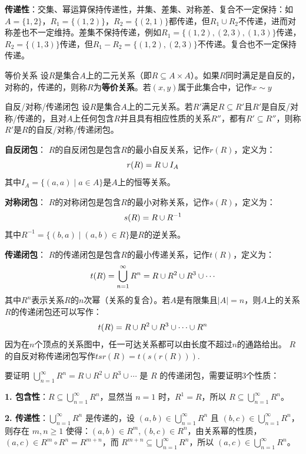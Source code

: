 \textbf{传递性}：交集、幂运算保持传递性，并集、差集、对称差、复合不一定保持：如$A = \{1,2\}$，$R_1 = \{(1,2)\}$，$R_2 = \{(2,1)\}$都传递，但$R_1 \cup R_2$不传递，进而对称差也不一定维持。差集不保持传递，例如$R_1=\{(1,2),(2,3),(1,3)\}$传递，$R_2=\{(1,3)\}$传递，但$R_1-R_2=\{(1,2),(2,3)\}$不传递。复合也不一定保持传递。
\begin{definition}{等价关系}{}
设$R$是集合$A$上的二元关系（即$R \subseteq A \times A$）。如果$R$同时满足是自反的，对称的，传递的，则称$R$为\textbf{等价关系}。若$(x,y)$属于此集合中，记作$x\sim y$
\end{definition}
\begin{definition}{自反/对称/传递闭包}{}
    设$R$是集合$A$上的二元关系。若$R'$满足$R \subseteq R'$且$R'$是自反/对称/传递的，且对$A$上任何包含$R$并且具有相应性质的关系$R''$，都有$R'\subseteq R''$，则称$R'$是$R$的自反/对称/传递闭包。

\textbf{自反闭包}：
$R$的自反闭包是包含$R$的最小自反关系，记作$r(R)$，定义为：\vspace{-10pt}
$$r(R) = R \cup I_A\vspace{-10pt}$$
其中$I_A = \{(a,a) \mid a \in A\}$是$A$上的恒等关系。

\textbf{对称闭包}：
$R$的对称闭包是包含$R$的最小对称关系，记作$s(R)$，定义为：\vspace{-10pt}
$$s(R) = R \cup R^{-1}\vspace{-10pt}$$
其中$R^{-1} = \{(b,a) \mid (a,b) \in R\}$是$R$的逆关系。

\textbf{传递闭包}：
$R$的传递闭包是包含$R$的最小传递关系，记作$t(R)$，定义为：\vspace{-10pt}
$$t(R) = \bigcup_{n=1}^{\infty} R^n = R \cup R^2 \cup R^3 \cup \cdots\vspace{-10pt}$$
其中$R^n$表示关系$R$的$n$次幂（关系的复合）。若$A$是有限集且$|A|=n$，则$A$上的关系$R$的传递闭包还可以写作：
\vspace{-10pt}
$$t(R) = R \cup R^2 \cup R^3 \cup \cdots\cup R^n\vspace{-10pt}$$
因为在$n$个顶点的关系图中，任一可达关系都可以由长度不超过$n$的通路给出。
$R$的自反对称传递闭包写作$tsr(R)=t(s(r(R)))$.
\end{definition}
要证明 $\bigcup_{n=1}^{\infty} R^n = R \cup R^2 \cup R^3 \cup \cdots$ 是 $R$ 的传递闭包，需要证明3个性质：

\textbf{1. 包含性}：$R \subseteq \bigcup_{n=1}^{\infty} R^n$，显然当 $n=1$ 时，$R^1 = R$，所以 $R \subseteq \bigcup_{n=1}^{\infty} R^n$。

\textbf{2. 传递性}：$\bigcup_{n=1}^{\infty} R^n$ 是传递的，设 $(a,b) \in \bigcup_{n=1}^{\infty} R^n$ 且 $(b,c) \in \bigcup_{n=1}^{\infty} R^n$，则存在 $m,n \geq 1$ 使得：$(a,b) \in R^m ,(b,c) \in R^n$，由关系幂的性质，$(a,c) \in R^m \circ R^n = R^{m+n}$，而 $R^{m+n} \subseteq \bigcup_{n=1}^{\infty} R^n$，所以 $(a,c) \in \bigcup_{n=1}^{\infty} R^n$。

